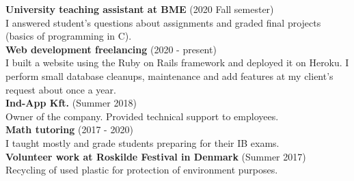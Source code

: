 \documentclass{article}
\begin{document}
\noindent
\textbf{University teaching assistant at BME} \hspace{3mm} \color{gray} (2020 Fall semester) \color{black} \\
I answered student's questions about assignments and graded final projects (basics of programming in C).
\smallskip \\

\noindent
\textbf{Web development freelancing} \hspace{3mm} \color{gray} (2020 - present) \color{black} \\
I built a website using the Ruby on Rails framework and deployed it on Heroku. I perform small database cleanups, maintenance and add features at my client's request about once a year.
\smallskip \\

\noindent
\textbf{Ind-App Kft.} \color{gray} (Summer 2018) \color{black} \\
Owner of the company. Provided technical support to employees.
\smallskip \\

\noindent
\textbf{Math tutoring} \hspace{3mm} \color{gray} (2017 - 2020) \color{black} \\
I taught mostly  and  grade students preparing for their IB exams.
\smallskip \\

\noindent
\textbf{Volunteer work at Roskilde Festival in Denmark} \color{gray} (Summer 2017) \color{black} \\
Recycling of used plastic for protection of environment purposes.
\vspace{5mm}
\end{document}

